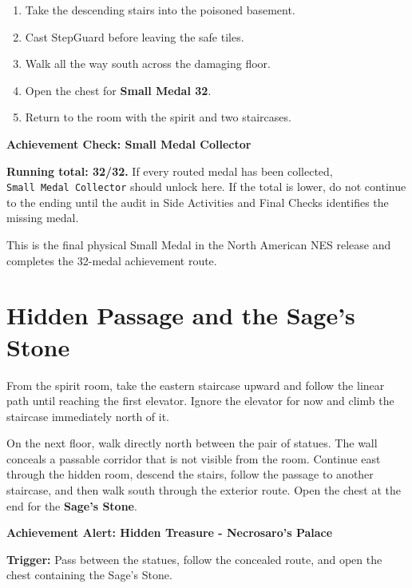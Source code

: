 \documentclass[
  american,
  10pt,
  letterpaper,
  oneside,
  open=any]{scrreprt}
\providecommand{\tightlist}{%
  \setlength{\itemsep}{0pt}\setlength{\parskip}{0pt}}
\begin{document}
\begin{enumerate}
\def\labelenumi{\arabic{enumi}.}
\tightlist
\item
  Take the descending stairs into the poisoned basement.
\item
  Cast StepGuard before leaving the safe tiles.
\item
  Walk all the way south across the damaging floor.
\item
  Open the chest for \textbf{Small Medal 32}.
\item
  Return to the room with the spirit and two staircases.
\end{enumerate}

\begin{guidenote}

\textbf{Achievement Check: Small Medal Collector}

\textbf{Running total: 32/32.} If every routed medal has been collected,
\texttt{Small\ Medal\ Collector} should unlock here. If the total is
lower, do not continue to the ending until the audit in Side Activities
and Final Checks identifies the missing medal.

\end{guidenote}

This is the final physical Small Medal in the North American NES release
and completes the 32-medal achievement route.

\section{Hidden Passage and the Sage's
Stone}\label{hidden-passage-and-the-sages-stone}

From the spirit room, take the eastern staircase upward and follow the
linear path until reaching the first elevator. Ignore the elevator for
now and climb the staircase immediately north of it.

On the next floor, walk directly north between the pair of statues. The
wall conceals a passable corridor that is not visible from the room.
Continue east through the hidden room, descend the stairs, follow the
passage to another staircase, and then walk south through the exterior
route. Open the chest at the end for the \textbf{Sage's Stone}.

\begin{achievementalert}

\textbf{Achievement Alert: Hidden Treasure - Necrosaro's Palace}

\textbf{Trigger:} Pass between the statues, follow the concealed route,
and open the chest containing the Sage's Stone.

\end{achievementalert}
\end{document}
